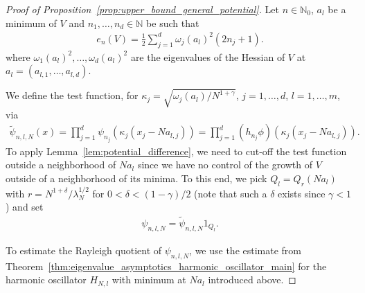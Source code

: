 \documentclass[12pt, reqno]{amsart}
\theoremstyle{definition}
\numberwithin{equation}{section}
\newcommand{\N}{{\mathbb N}}
\begin{document}
\begin{proof}[Proof of Proposition~\ref{prop:upper_bound_general_potential}]
    Let $n\in\N_0$, $a_l$ be a minimum of $V$ and $n_1,\ldots,n_d\in\N$ be such that
    \begin{align*}
        e_n(V)=\frac12\sum_{j=1}^d \omega_j(a_l)^2(2n_j+1).
    \end{align*}
    where $\omega_1(a_l)^2,\ldots,\omega_d(a_l)^2$ are the eigenvalues of the Hessian of $V$ at $a_l=(a_{l,1},\ldots,a_{l,d})$.

    We define the test function, for $\kappa_j=\sqrt{\omega_j(a_l)/N^{1+\gamma}}$, $j=1,\ldots,d$, $l=1,\ldots,m$,  via
    \begin{align*}
        \tilde\psi_{n,l,N}(x) = \prod_{j=1}^d \psi_{n_j}\left( \kappa_j (x_j-Na_{l,j}) \right)    
        =\prod_{j=1}^d (h_{n_j} \phi)\left(\kappa_j (x_j-Na_{l,j})\right).       
    \end{align*}
    To apply Lemma~\ref{lem:potential_difference}, we need to cut-off the test function outside a neighborhood of $Na_l$ since we have no control of the growth of $V$ outside of a neighborhood of its minima. To this end, we pick $Q_l=Q_{r}(Na_l)$ with $r=N^{1+\delta}/\lambda_N^{{1/2}}$ for $0<\delta< (1-\gamma)/2$  (note that such a $\delta$ exists since $\gamma<1$)
    and set
   \begin{align*}
        \psi_{n,l,N}=\tilde\psi_{n,l,N}1_{Q_l}.
    \end{align*}

    To estimate the Rayleigh quotient of $\psi_{n,l,N}$, we use the estimate from Theorem~\ref{thm:eigenvalue_asymptotics_harmonic_oscillator_main} for the harmonic oscillator  $H_{N,l}$ with minimum at $Na_l$ introduced above.


\end{proof}
\end{document}
